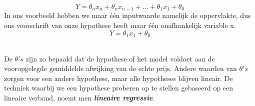 %
\[Y =  \theta_{n}x_{n} + \theta_{n}x_{n-1} + ... + \theta_{1}x_{1} + \theta_{0}\]
%
In ons voorbeeld hebben we maar \'e\'en inputwaarde namelijk de oppervlakte, dus ons voorschrift van onze hypothese heeft maar \'e\'en onafhankelijk variable x.
\newline
\[ Y = \theta_{1}x_{1} + \theta_{0}\] \\ 
\begin{center}
\end{center}
\newline
%
%
De $\theta's$ zijn zo bepaald dat de hypothese of het model voldoet aan de vooropgelegde gemiddelde afwijking van de echte prijs. Andere waarden van $\theta's$ zorgen voor een andere  hypothese, maar alle hypotheses blijven lineair. De techniek waarbij we een hypothese proberen op te stellen gebaseerd op een lineaire verband, noemt men \textbf{\textit{lineaire regressie}}. 
